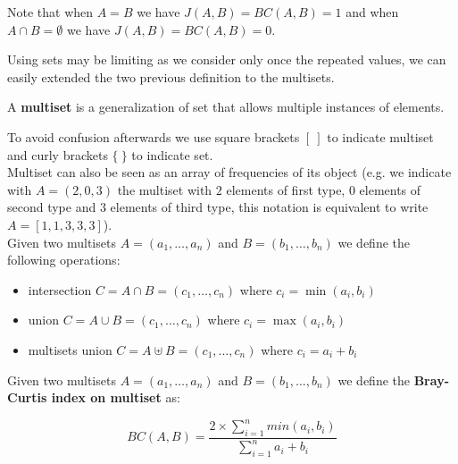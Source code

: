 Note that when $A = B$ we have $J(A,B) = BC(A,B) = 1$ and when $A \cap B = \emptyset$ we have $J(A,B) = BC(A,B) = 0$.

Using sets may be limiting as we consider only once the repeated values, we can easily extended the two previous definition to the multisets.\\

\begin{definizione}
	A \textbf{multiset} is a generalization of set that allows multiple instances of elements.
\end{definizione}

To avoid confusion afterwards we use square brackets $[\ ]$ to indicate multiset and curly brackets $\{\ \}$ to indicate set.\\

Multiset can also be seen as an array of frequencies of its object (e.g. we indicate with $A = (2, 0, 3)$ the multiset with $2$ elements of first type, $0$ elements of second type and $3$ elements of third type, this notation is equivalent to write $A = [1, 1, 3, 3, 3]$).\\

Given two multisets $A = (a_{1}, \ldots, a_{n}) $ and $B = (b_{1}, \ldots, b_{n})$ we define the following operations:

\begin{itemize}
  \item intersection $C = A \cap B  = (c_{1}, \ldots, c_{n})$ where $c_{i} = \min(a_{i}, b_{i})$
  \item union $C = A \cup B  = (c_{1}, \ldots, c_{n})$ where $c_{i} = \max(a_{i}, b_{i})$
  \item multisets union $C = A \uplus B  = (c_{1}, \ldots, c_{n})$ where $c_{i} = a_{i} + b_{i}$
\end{itemize}

%     


\begin{definizione}\label{def:wbray}
    Given two multisets $A = (a_{1}, \ldots, a_{n}) $ and $B = (b_{1}, \ldots, b_{n})$ we define the \textbf{Bray-Curtis index on multiset} as:
    
    \begin{equation}
    BC(A,B) = \frac{ 2 \times \sum\limits_{i=1}^n { min(a_{i}, b_{i}) } }{\sum\limits_{i=1}^n {a_{i} + b_{i}}}
    \end{equation}
    
\end{definizione}

